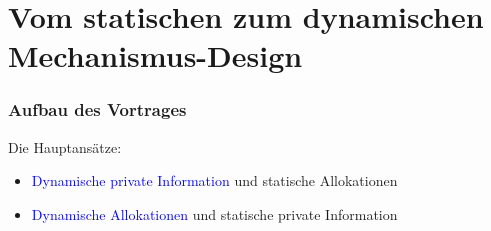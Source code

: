 \section{Vom statischen zum dynamischen Mechanismus-Design}

\begin{frame}
\frametitle{Aufbau des Vortrages}
\justifying
Die Hauptans\"atze:
\begin{itemize}
    \item \textcolor{blue}{Dynamische private Information} und statische Allokationen
    \item \textcolor{blue}{Dynamische Allokationen} und statische private Information
\end{itemize}

\end{frame}
